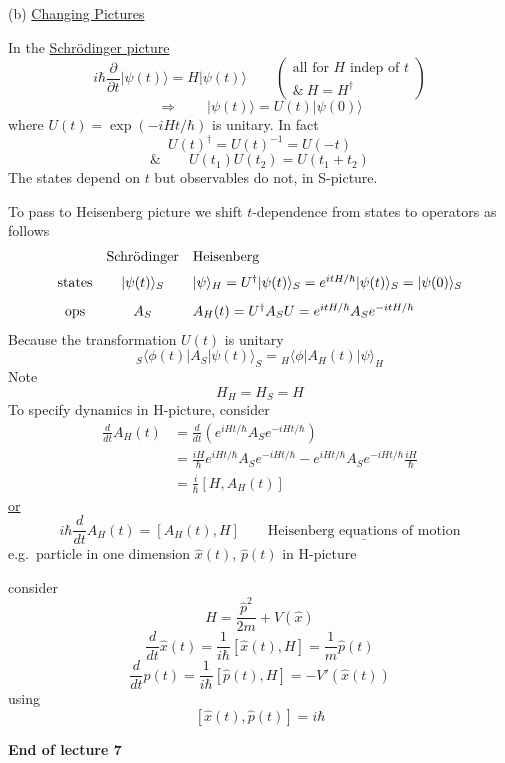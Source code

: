 \documentclass[11pt,a4paper]{article}
\begin{document}
\medskip
\noindent
(b) \underline{Changing Pictures}

In the \underline{Schr\"odinger picture}
\[
    i\hbar\frac{\partial}{\partial t}|\psi(t)\rangle=H|\psi(t)\rangle
    \qquad\left(\begin{gathered}\text{all for }H\text{ indep of }t\\\&\ H=H^\dagger\end{gathered}\right)
\]
\[
    \Rightarrow\qquad |\psi(t)\rangle=U(t)|\psi(0)\rangle
\]
where $U(t)=\exp(-iHt/\hbar)$ is unitary. In fact
\[
    U(t)^\dagger=U(t)^{-1}=U(-t)
\]
\[
    \&\qquad U(t_1)U(t_2)=U(t_1+t_2)
\]
The states depend on $t$ but observables do not, in S-picture.

To pass to Heisenberg picture we shift $t$-dependence from states to
operators as follows
\[
    \begin{array}{c@{\quad}c@{\quad}l}
        &\text{Schr\"odinger}&\text{Heisenberg}\\[6pt]
        \text{states}&|\psi(t)\rangle_S
        &|\psi\rangle_H=U^\dagger|\psi(t)\rangle_S
        =e^{itH/\hbar}|\psi(t)\rangle_S=|\psi(0)\rangle_S\\[8pt]
        \text{ops}&A_S&A_H(t)=U^\dagger A_SU=e^{itH/\hbar}A_Se^{-itH/\hbar}
    \end{array}
\]
Because the transformation $U(t)$ is unitary
\[
    {}_S\langle\phi(t)|A_S|\psi(t)\rangle_S
    ={}_H\langle\phi|A_H(t)|\psi\rangle_H
\]
Note
\[
    H_H=H_S=H
\]
To specify dynamics in H-picture, consider
\begin{align*}
    \frac{d}{dt}A_H(t)
    &=\frac{d}{dt}\left(e^{iHt/\hbar}A_Se^{-iHt/\hbar}\right)\\
    &=\frac{iH}{\hbar}e^{iHt/\hbar}A_Se^{-iHt/\hbar}
      -e^{iHt/\hbar}A_Se^{-iHt/\hbar}\frac{iH}{\hbar}\\
    &=\frac{i}{\hbar}[H,A_H(t)]
\end{align*}
\underline{or}
\[
    i\hbar\frac{d}{dt}A_H(t)=[A_H(t),H]
    \qquad\underline{\text{Heisenberg equations of motion}}
\]
e.g.\ particle in one dimension $\hat{x}(t)$, $\hat{p}(t)$ in H-picture

consider
\[
    H=\frac{\hat{p}^2}{2m}+V(\hat{x})
\]
\[
    \frac{d}{dt}\hat{x}(t)=\frac{1}{i\hbar}[\hat{x}(t),H]
    =\frac{1}{m}\hat{p}(t)
\]
\[
    \frac{d}{dt}\hat{p}(t)=\frac{1}{i\hbar}[\hat{p}(t),H]
    =-V'(\hat{x}(t))
\]
using
\[
    [\hat{x}(t),\hat{p}(t)]=i\hbar
\]

\begin{center}
    \textbf{End of lecture 7}
\end{center}
\end{document}
